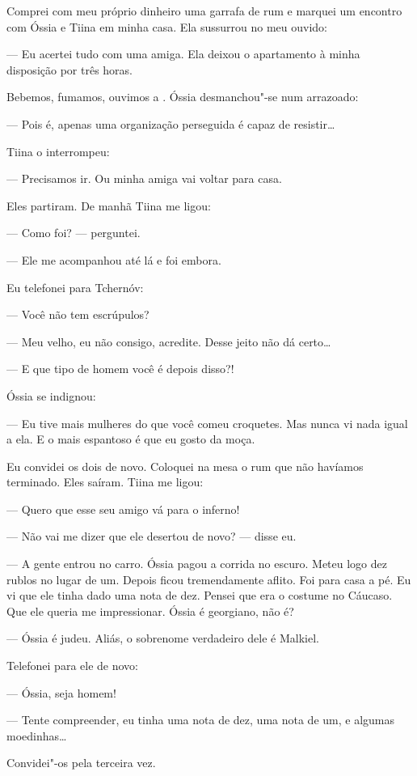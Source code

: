Comprei com meu próprio dinheiro uma garrafa de rum e marquei um
encontro com Óssia e Tiina em minha casa. Ela sussurrou no meu ouvido:

--- Eu acertei tudo com uma amiga. Ela deixou o apartamento à minha
disposição por três horas.

Bebemos, fumamos, ouvimos a \emph{}. Óssia desmanchou"-se num
arrazoado:

--- Pois é, apenas uma organização perseguida é capaz de resistir\ldots{}

Tiina o interrompeu:

--- Precisamos ir. Ou minha amiga vai voltar para casa.

Eles partiram. De manhã Tiina me ligou:

--- Como foi? --- perguntei.

--- Ele me acompanhou até lá e foi embora.

Eu telefonei para Tchernóv:

--- Você não tem escrúpulos?

--- Meu velho, eu não consigo, acredite. Desse jeito não dá certo\ldots{}

--- E que tipo de homem você é depois disso?!

Óssia se indignou:

--- Eu tive mais mulheres do que você comeu croquetes. Mas nunca vi nada
igual a ela. E o mais espantoso é que eu gosto da moça.

Eu convidei os dois de novo. Coloquei na mesa o rum que não havíamos
terminado. Eles saíram. Tiina me ligou:

--- Quero que esse seu amigo vá para o inferno!

--- Não vai me dizer que ele desertou de novo? --- disse eu.

--- A gente entrou no carro. Óssia pagou a corrida no escuro. Meteu logo
dez rublos no lugar de um. Depois ficou tremendamente aflito. Foi para
casa a pé. Eu vi que ele tinha dado uma nota de dez. Pensei que era o
costume no Cáucaso. Que ele queria me impressionar. Óssia é georgiano,
não é?

--- Óssia é judeu. Aliás, o sobrenome verdadeiro dele é Malkiel.

Telefonei para ele de novo:

--- Óssia, seja homem!

--- Tente compreender, eu tinha uma nota de dez, uma nota de um, e
algumas moedinhas\ldots{}

Convidei"-os pela terceira vez.

